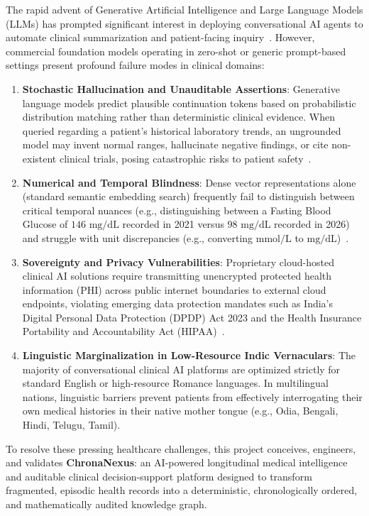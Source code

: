 The rapid advent of Generative Artificial Intelligence and Large Language Models (LLMs) has prompted significant interest in deploying conversational AI agents to automate clinical summarization and patient-facing inquiry~\cite{wornow2023shaky,yang2022gatortron}. However, commercial foundation models operating in zero-shot or generic prompt-based settings present profound failure modes in clinical domains:
\begin{enumerate}
    \item \textbf{Stochastic Hallucination and Unauditable Assertions}: Generative language models predict plausible continuation tokens based on probabilistic distribution matching rather than deterministic clinical evidence. When queried regarding a patient's historical laboratory trends, an ungrounded model may invent normal ranges, hallucinate negative findings, or cite non-existent clinical trials, posing catastrophic risks to patient safety~\cite{pampari2018emrqa}.
    \item \textbf{Numerical and Temporal Blindness}: Dense vector representations alone (standard semantic embedding search) frequently fail to distinguish between critical temporal nuances (e.g., distinguishing between a Fasting Blood Glucose of $146\text{ mg/dL}$ recorded in 2021 versus $98\text{ mg/dL}$ recorded in 2026) and struggle with unit discrepancies (e.g., converting $\text{mmol/L}$ to $\text{mg/dL}$)~\cite{gao2023rag_survey}.
    \item \textbf{Sovereignty and Privacy Vulnerabilities}: Proprietary cloud-hosted clinical AI solutions require transmitting unencrypted protected health information (PHI) across public internet boundaries to external cloud endpoints, violating emerging data protection mandates such as India's Digital Personal Data Protection (DPDP) Act 2023 and the Health Insurance Portability and Accountability Act (HIPAA)~\cite{nha2022abdm}.
    \item \textbf{Linguistic Marginalization in Low-Resource Indic Vernaculars}: The majority of conversational clinical AI platforms are optimized strictly for standard English or high-resource Romance languages. In multilingual nations, linguistic barriers prevent patients from effectively interrogating their own medical histories in their native mother tongue (e.g., Odia, Bengali, Hindi, Telugu, Tamil).
\end{enumerate}

To resolve these pressing healthcare challenges, this project conceives, engineers, and validates \textbf{ChronaNexus}: an AI-powered longitudinal medical intelligence and auditable clinical decision-support platform designed to transform fragmented, episodic health records into a deterministic, chronologically ordered, and mathematically audited knowledge graph.


